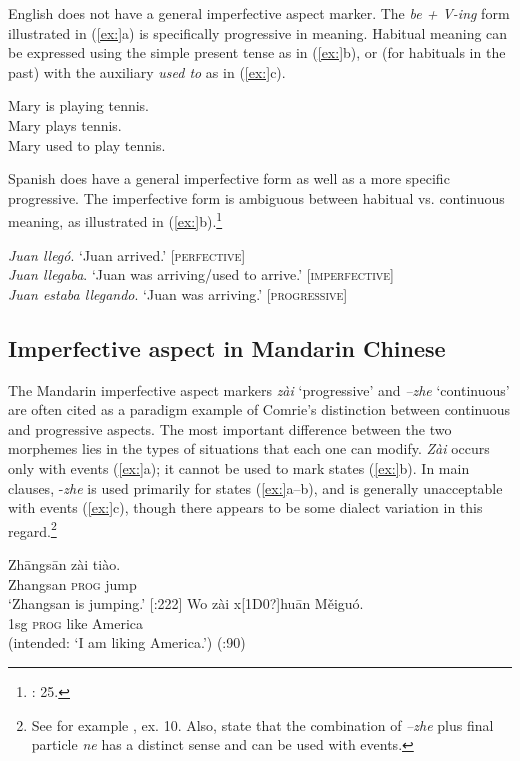 English does not have a general imperfective aspect marker. The \textit{be + V-ing} form illustrated in (\ref{ex:}a) is specifically progressive in meaning. Habitual meaning can be expressed using the simple present tense as in (\ref{ex:}b), or (for habituals in the past) with the auxiliary \textit{used to} as in (\ref{ex:}c).


\ea
\ea Mary is playing tennis.\\
\ex Mary plays tennis.\\
\ex Mary used to play tennis.
                       \z
\z


Spanish does have a general imperfective form as well as a more specific progressive. The imperfective form is ambiguous between habitual vs. continuous meaning, as illustrated in (\ref{ex:}b).\footnote{\citealt{Comrie1976}: 25.}


\ea
\ea \textit{Juan llegó}.  ‘Juan arrived.’  [\textsc{perfective}]\\
\ex \textit{Juan llegaba}.  ‘Juan was arriving/used to arrive.’  [\textsc{imperfective}]\\
\ex \textit{Juan estaba llegando}.  ‘Juan was arriving.’  [\textsc{progressive}]
                       \z
\z

\subsection{Imperfective aspect in Mandarin Chinese}\label{sec:} %

The Mandarin imperfective aspect markers \textit{zài} ‘progressive’ and \textit{–zhe} ‘continuous’ are often cited as a paradigm example of Comrie’s distinction between continuous and progressive aspects. The most important difference between the two morphemes lies in the types of situations that each one can modify. \textit{Zài} occurs only with events (\ref{ex:}a); it cannot be used to mark states (\ref{ex:}b). In main clauses, -\textit{zhe} is used primarily for states (\ref{ex:}a--b), and is generally unacceptable with events (\ref{ex:}c), though there appears to be some dialect variation in this regard.\footnote{See for example \citet[738]{KleinEtAl2000}, ex. 10. Also, \citet{LiThompson1981} state that the combination of \textit{–zhe} plus final particle \textit{ne} has a distinct sense and can be used with events.}

\ea
\ea \gll  Zh\=angs\=an  zài  tiào.\\
Zhangsan  \textsc{prog}  jump\\
\glt ‘Zhangsan is jumping.’   [\citealt{LiThompson1981}:222]
\ex \gll  *Wo  zài  x[1D0?]hu\=an  Měiguó.\\
  1sg  \textsc{prog}  like  America\\
\glt (intended: ‘I am liking America.’)  (\citealt{Sun2011}:90)
\z \z


